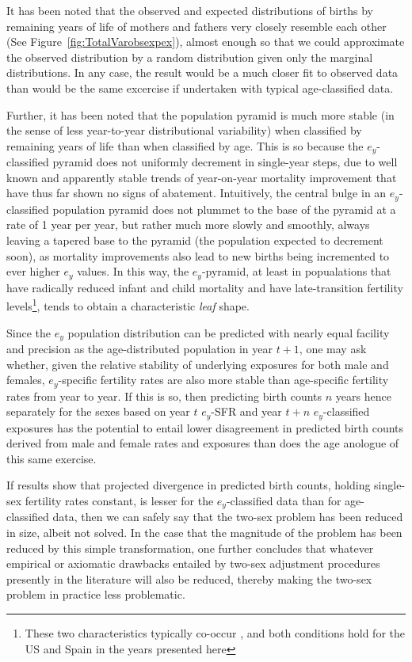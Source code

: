  \FloatBarrier
\label{sec:exdivergence}
It has been noted that the observed and expected distributions of births by
remaining years of life of mothers and fathers very closely resemble each other
(See Figure~\ref{fig:TotalVarobsexpex}), almost enough so that we could
approximate the observed distribution by a random distribution given only the
marginal distributions. In any case, the result would be a much closer fit to
observed data than would be the same excercise if undertaken with typical
age-classified data. 

Further, it has been noted that the population pyramid is
much more stable (in the sense of less year-to-year
distributional variability) when classified by remaining years
of life than when classified by age. This is so because the $e_y$-classified 
pyramid does not uniformly decrement in single-year steps, due
to well known and apparently stable trends of year-on-year mortality improvement
that have thus far shown no signs of abatement. Intuitively, the central bulge
in an $e_y$-classified population pyramid does not plummet to the base of the 
pyramid at a rate of 1
year per year, but rather much more slowly and smoothly, always leaving a
tapered base to the pyramid (the population expected to decrement soon), as
mortality improvements also lead to new births being incremented to ever higher
$e_y$ values. In this way, the $e_y$-pyramid, at least in popualations that have
radically reduced infant and child mortality and have late-transition fertility 
levels\footnote{These two characteristics typically co-occur
\citep{macinnes2009reproductive}, and both conditions hold for the US and Spain
in the years presented here}, tends to obtain a characteristic \textit{leaf}
shape.

Since the $e_y$ population distribution can be predicted
with nearly equal facility and precision as the age-distributed population in
year $t+1$, one may ask whether, given the relative stability of underlying
exposures for both male and females, $e_y$-specific fertility rates are 
also more stable than
age-specific fertility rates from year to year. If this is so, then predicting 
birth counts $n$ years hence separately for the sexes based
on year $t$ $e_y$-SFR and year $t + n$ $e_y$-classified exposures has the
potential to entail lower disagreement in predicted birth counts derived
from male and female rates and exposures than does the age
anologue of this same exercise.

If results show that projected divergence in predicted birth counts, holding
single-sex fertility rates constant, is lesser for the $e_y$-classified data
than for age-classified data, then we can safely say that the two-sex problem
has been reduced in size, albeit not solved. In the case that the magnitude of
the problem has been reduced by this simple transformation, one further
concludes that whatever empirical or axiomatic drawbacks entailed by 
two-sex adjustment procedures presently in the literature will also be reduced,
thereby making the two-sex problem in practice less problematic. 

